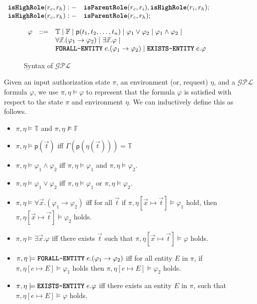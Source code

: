 \documentclass{sig-alternate}
\newcommand{\state}{\ensuremath{\pi}\xspace}
\newcommand{\planguage}{\ensuremath{\mathbf{\mathcal{GPL}}}\xspace}
\newcommand{\funcname}[1]{\textbf{\texttt{#1}}}
\newcommand{\policy}{\ensuremath{\varphi}\xspace}
\newcommand{\true}{\ensuremath{\mathbb{T}}\xspace}
\newcommand{\false}{\ensuremath{\mathbb{F}}\xspace}
\newcommand{\pred}[1]{\ensuremath{\mathsf{#1}}\xspace}
\newcommand{\foralle}{\ensuremath{\funcname{FORALL-ENTITY}}\xspace}
\newcommand{\existse}{\ensuremath{\funcname{EXISTS-ENTITY}}\xspace}
\begin{document}
\noindent
\begin{small}
$
\begin{array}{ll}
\funcname{isHighRole}(r_c, r_h) :- &\funcname{isParentRole}(r_c, r_i),\funcname{isHighRole}(r_i, r_h) ;\\
\funcname{isHighRole}(r_c, r_h) :- &\funcname{isParentRole}(r_c, r_h) ;
\end{array}
$
\end{small}

\begin{figure}[t]
\centering
$
\begin{array}{lll}
\policy & ::= & \true \mid \false \mid \pred{p}(t_1, t_2, \ldots,t_n)\mid \policy_1\vee\policy_2 \mid \policy_1\wedge \policy_2 \mid\\
& & \forall\vec{x}.(\policy_1\rightarrow\policy_2) \mid \exists\vec{x}.\policy\mid\\
& & \foralle\;e.(\policy_1\rightarrow\policy_2)\mid \existse\;e.\policy
\end{array}
$
\caption{Syntax of \planguage}\label{fig:logic}
\end{figure}

Given an input authorization state \state, an environment (or, request) $\eta$, and 
a \planguage formula \policy, we use $\state, \eta\models\policy$ to represent that 
the formula \policy is satisfied with respect to the state \state and environment $\eta$. 
We can inductively define this as follows.\vspace*{-0.1in}
\begin{itemize}\setlength{\itemsep}{0em}
 \item $\state, \eta\models\true$ and $\state,\eta\not\models\false$ 
 \item $\state, \eta\models\pred{p}(\vec{t})$ iff $\Gamma(\pred{p}(\eta(\vec{t}))) = \true$ 
 \item $\state, \eta\models\policy_1\wedge \policy_2$ iff $\state, \eta\models\policy_1$ and $\state, \eta\models\policy_2$. 
 \item $\state, \eta\models\policy_1\vee\policy_2$ iff $\state, \eta\models\policy_1$ or $\state, \eta\models\policy_2$. 
 \item $\state, \eta\models\forall\vec{x}.(\policy_1\rightarrow\policy_2)$ iff for all $\vec{t}$  if 
 $\state, \eta[\vec{x}\mapsto\vec{t}]\models\policy_1$ hold, then $\state, \eta[\vec{x}\mapsto\vec{t}]\models\policy_2$ holds. 
 \item $\state, \eta\models\exists\vec{x}.\policy$ iff there exists $\vec{t}$ such that $\state, \eta[\vec{x}\mapsto\vec{t}]\models\policy$ holds. 
 \item $\state, \eta\models\foralle\;e.(\policy_1\rightarrow\policy_2)$ iff for all entity $E$ in \state, if $\state, \eta[e\mapsto E]\models\policy_1$ holds 
 then $\state, \eta[e\mapsto E]\models\policy_2$ holds. 
 \item $\state, \eta\models\existse\;e.\policy$ iff there exists an entity $E$ in \state, such that $\state, \eta[e\mapsto E]\models\policy$ holds. 
 \end{itemize}
\end{document}
